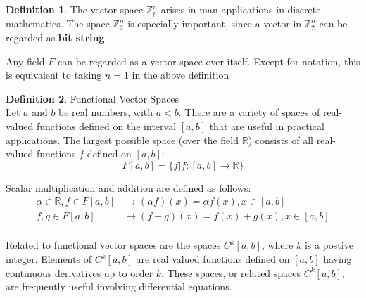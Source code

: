 \documentclass{book}
\theoremstyle{definition}
\newtheorem{definition}{Definition}[section]
\theoremstyle{remark}
\newcommand{\bb}[1]{\mathbb{#1}}
\begin{document}
\begin{definition}
    The vector space $\bb{Z}_p^n$ arises in man applications in discrete mathematics. The space $\bb{Z}_2^n$ is especially important, since a vector in $\bb{Z}_2^n$  can be regarded as \textbf{bit string}\footnotemark
    
    
    Any field $F$ can be regarded as a vector space over itself. Except for notation, this is equivalent to taking $n=1$ in the above definition
\end{definition}


\newpage
\begin{definition}
Functional Vector Spaces \\

    Let $a$ and $b$ be real numbers, with $a < b$. There are a variety of spaces of real-valued functions defined on the interval $[a,b]$ that are useful in practical applications. The largest possible space (over the field $\bb{R}$) consists of all real-valued functions $f$ defined on $[a,b]$:
        \begin{equation*}
            F[a,b] = \{f|f : [a,b] \to \bb{R}  \}
        \end{equation*}
    
    Scalar multiplication and addition are defined as follows:
        \begin{align*}
            \alpha \in \bb{R}, f \in F[a,b] & \to (\alpha f)(x) = \alpha f(x), x \in [a,b] \\
            f,g \in F[a,b] & \to (f + g)(x) = f(x) + g(x), x \in [a,b] \\
        \end{align*}
    
    Related to functional vector spaces are the spaces $C^k[a,b]$, where $k$ is a postive integer. Elements of $C^k[a,b]$ are real valued functions defined on $[a,b]$ having continuous derivatives up to order $k$. These spaces, or related spaces $C^k[a,b]$, are frequently useful involving differential equations. 
\end{definition}
\end{document}
